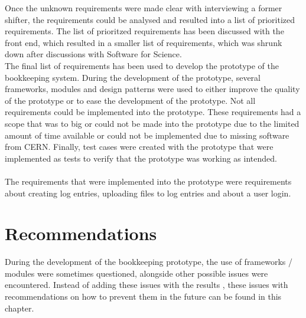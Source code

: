 \documentclass[paper=a4, fontsize=11pt,twoside]{scrartcl}	%
\begin{document}
Once the unknown requirements were made clear with interviewing a former shifter, the requirements could be analysed and resulted into a list of prioritized requirements. The list of prioritzed  requirements has been discussed with the front end, which resulted in a smaller list of requirements, which was shrunk down after discussions with Software for Science. \\ The final list of requirements has been used to develop the prototype of the bookkeeping system. During the development of the prototype, several frameworks, modules and design patterns were used to either improve the quality of the prototype or to ease the development of the prototype. Not all requirements could be implemented into the prototype. These requirements had a scope that was to big or could not be made into the prototype due to the limited amount of time available or could not be implemented due to missing software from CERN. Finally, test cases were created with the prototype that were implemented as tests to verify that the prototype was working as intended. \\ \\
The requirements that were implemented into the prototype were requirements about creating log entries, uploading files to log entries and about a user login. 

\newpage
\section{Recommendations}
During the development of the bookkeeping prototype, the use of frameworks / modules were sometimes questioned, alongside other possible issues were encountered. Instead of adding these issues with the results , these issues with recommendations on how to prevent them in the future can be found in this chapter. \\ 
\end{document}
